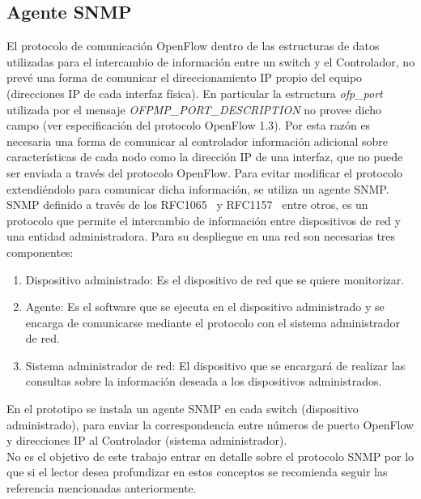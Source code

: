 \subsection{Agente SNMP}
El protocolo de comunicación OpenFlow dentro de las estructuras de datos utilizadas para el intercambio de información entre un switch y el Controlador, no prev\'e una forma de comunicar el direccionamiento IP propio del equipo (direcciones IP de cada interfaz física). En particular la estructura \textit{ofp\_port} utilizada por el mensaje \textit{OFPMP\_PORT\_DESCRIPTION} no provee dicho campo (ver especificación del protocolo OpenFlow 1.3\citep{ofv133spec}). Por esta razón es necesaria una forma de comunicar al controlador información adicional sobre características de cada nodo como la dirección IP de una interfaz, que no puede ser enviada a través del protocolo OpenFlow. Para evitar modificar el protocolo extendiéndolo para comunicar dicha informaci\'on, se utiliza un agente SNMP.\\

SNMP definido a través de los RFC1065~\citep{rose1990structure} y RFC1157~\citep{case1989simple} entre otros, es un protocolo que permite el intercambio de información entre dispositivos de red y una entidad administradora. Para su despliegue en una red son necesarias tres componentes: 

\begin{enumerate}

\item Dispositivo administrado: Es el dispositivo de red que se quiere monitorizar.

\item Agente: Es el software que se ejecuta en el dispositivo administrado y se encarga de comunicarse mediante el protocolo con el sistema administrador de red.

\item Sistema administrador de red: El dispositivo que se encargar\'a de realizar las consultas sobre la información deseada a los dispositivos administrados.

\end{enumerate}	

En el prototipo se instala un agente SNMP en cada switch (dispositivo administrado), para enviar la correspondencia entre números de puerto OpenFlow y direcciones IP al Controlador (sistema administrador).\\

No es el objetivo de este trabajo entrar en detalle sobre el protocolo SNMP por lo que si el lector desea profundizar en estos conceptos se recomienda seguir las referencia mencionadas anteriormente.

